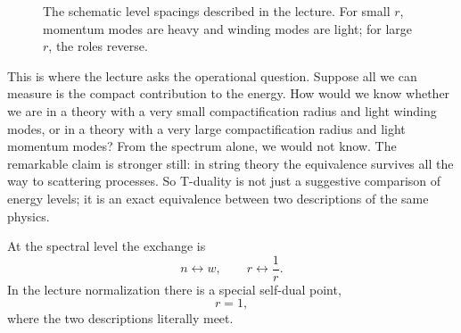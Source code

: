 \begin{figure}[htbp]
\centering
{}
\caption{The schematic level spacings described in the lecture. For small \(r\), momentum modes are heavy and winding modes are light; for large \(r\), the roles reverse.}
\end{figure}

This is where the lecture asks the operational question. Suppose all we can measure is the compact contribution to the energy. How would we know whether we are in a theory with a very small compactification radius and light winding modes, or in a theory with a very large compactification radius and light momentum modes? From the spectrum alone, we would not know. The remarkable claim is stronger still: in string theory the equivalence survives all the way to scattering processes. So T-duality is not just a suggestive comparison of energy levels; it is an exact equivalence between two descriptions of the same physics.

At the spectral level the exchange is
\begin{equation}
n \leftrightarrow w, \qquad r \leftrightarrow \frac{1}{r}.
\end{equation}
In the lecture normalization there is a special self-dual point,
\begin{equation}
r=1,
\end{equation}
where the two descriptions literally meet.

